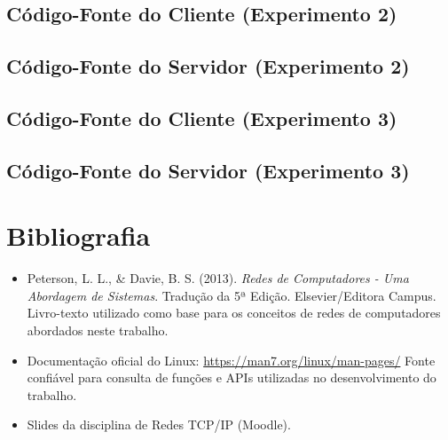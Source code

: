 \documentclass{article}
\begin{document}


\subsection{Código-Fonte do Cliente (Experimento 2)}



\subsection{Código-Fonte do Servidor (Experimento 2)}



\subsection{Código-Fonte do Cliente (Experimento 3)}



\subsection{Código-Fonte do Servidor (Experimento 3)}



\section{Bibliografia}

\begin{itemize}
    \item Peterson, L. L., & Davie, B. S. (2013). \textit{Redes de Computadores - Uma Abordagem de Sistemas}. Tradução da 5ª Edição. Elsevier/Editora Campus.  
    Livro-texto utilizado como base para os conceitos de redes de computadores abordados neste trabalho.

    \item Documentação oficial do Linux: \url{https://man7.org/linux/man-pages/}  
    Fonte confiável para consulta de funções e APIs utilizadas no desenvolvimento do trabalho.

    \item Slides da disciplina de Redes TCP/IP (Moodle).
\end{itemize}
\end{document}
